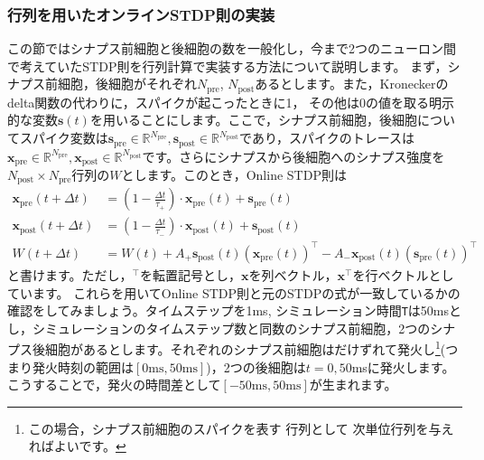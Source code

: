 \subsubsection{行列を用いたオンラインSTDP則の実装}
この節ではシナプス前細胞と後細胞の数を一般化し，今まで2つのニューロン間で考えていたSTDP則を行列計算で実装する方法について説明します。
まず，シナプス前細胞，後細胞がそれぞれ$N_\text{pre}$, $N_\text{post}$あるとします。また，Kroneckerのdelta関数の代わりに，スパイクが起こったときに1， その他は0の値を取る明示的な変数$\boldsymbol{s}(t)$を用いることにします。ここで，シナプス前細胞，後細胞についてスパイク変数は$\boldsymbol{s}_{\text{pre}} \in \mathbb{R}^{N_\text{pre}}, \boldsymbol{s}_{\text{post}} \in \mathbb{R}^{N_\text{post}}$であり，スパイクのトレースは$\boldsymbol{x}_{\text{pre}} \in \mathbb{R}^{N_\text{pre}}, \boldsymbol{x}_{\text{post}} \in \mathbb{R}^{N_\text{post}}$です。さらにシナプスから後細胞へのシナプス強度を$N_\text{post} \times N_\text{pre}$行列の$W$とします。このとき，Online STDP則は
\begin{align}
\boldsymbol{x}_{\text{pre}}(t+\Delta t)&=\left(1-\frac{\Delta t}{\tau_{+}}\right)\cdot \boldsymbol{x}_{\text{pre}}(t)+
\boldsymbol{s}_{\text{pre}}(t)\\
\boldsymbol{x}_{\text{post}}(t+\Delta t)&=\left(1-\frac{\Delta t}{\tau_{-}}\right)\cdot \boldsymbol{x}_{\text{post}}(t)+\boldsymbol{s}_{\text{post}}(t)\\
W(t+\Delta t)&=W(t)+A_+ \boldsymbol{s}_{\text{post}}(t)(\boldsymbol{x}_{\text{pre}}(t))^\top - A_-\boldsymbol{x}_{\text{post}}(t)(\boldsymbol{s}_{\text{pre}}(t))^\top
\end{align}
と書けます。ただし，$^\top$を転置記号とし，$\boldsymbol{x}$を列ベクトル，$\boldsymbol{x}^\top$を行ベクトルとしています。
これらを用いてOnline STDP則と元のSTDPの式が一致しているかの確認をしてみましょう。タイムステップを1ms, シミュレーション時間\texttt{T}は50msとし，シミュレーションのタイムステップ数と同数のシナプス前細胞，2つのシナプス後細胞があるとします。それぞれのシナプス前細胞はだけずれて発火し\footnote{この場合，シナプス前細胞のスパイクを表す  行列として  次単位行列を与えればよいです。}(つまり発火時刻の範囲は$[0\text{ms}, 50\text{ms}]$)，2つの後細胞は$t=0, 50$msに発火します。こうすることで，発火の時間差として$[-50\text{ms}, 50\text{ms}]$が生まれます。

